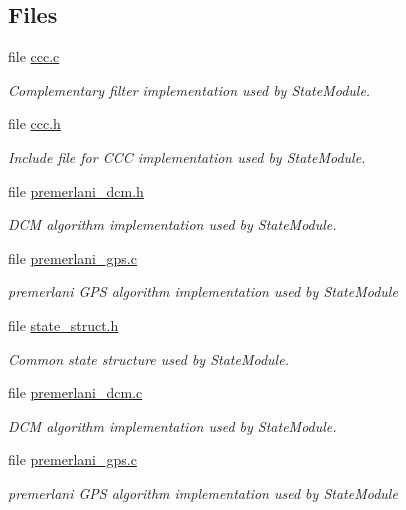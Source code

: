 \subsection*{\-Files}
\begin{DoxyCompactItemize}
\item 
file \hyperlink{ccc_8c}{ccc.\-c}
\begin{DoxyCompactList}\small\item\em \-Complementary filter implementation used by \-State\-Module. \end{DoxyCompactList}\item 
file \hyperlink{ccc_8h}{ccc.\-h}
\begin{DoxyCompactList}\small\item\em \-Include file for \-C\-C\-C implementation used by \-State\-Module. \end{DoxyCompactList}\item 
file \hyperlink{premerlani__dcm_8h}{premerlani\-\_\-dcm.\-h}
\begin{DoxyCompactList}\small\item\em \-D\-C\-M algorithm implementation used by \-State\-Module. \end{DoxyCompactList}\item 
file \hyperlink{premerlani__gps_8c}{premerlani\-\_\-gps.\-c}
\begin{DoxyCompactList}\small\item\em premerlani \-G\-P\-S algorithm implementation used by \-State\-Module \end{DoxyCompactList}\item 
file \hyperlink{state__struct_8h}{state\-\_\-struct.\-h}
\begin{DoxyCompactList}\small\item\em \-Common state structure used by \-State\-Module. \end{DoxyCompactList}\item 
file \hyperlink{premerlani__dcm_8c}{premerlani\-\_\-dcm.\-c}
\begin{DoxyCompactList}\small\item\em \-D\-C\-M algorithm implementation used by \-State\-Module. \end{DoxyCompactList}\item 
file \hyperlink{premerlani__gps_8c}{premerlani\-\_\-gps.\-c}
\begin{DoxyCompactList}\small\item\em premerlani \-G\-P\-S algorithm implementation used by \-State\-Module \end{DoxyCompactList}\end{DoxyCompactItemize}
